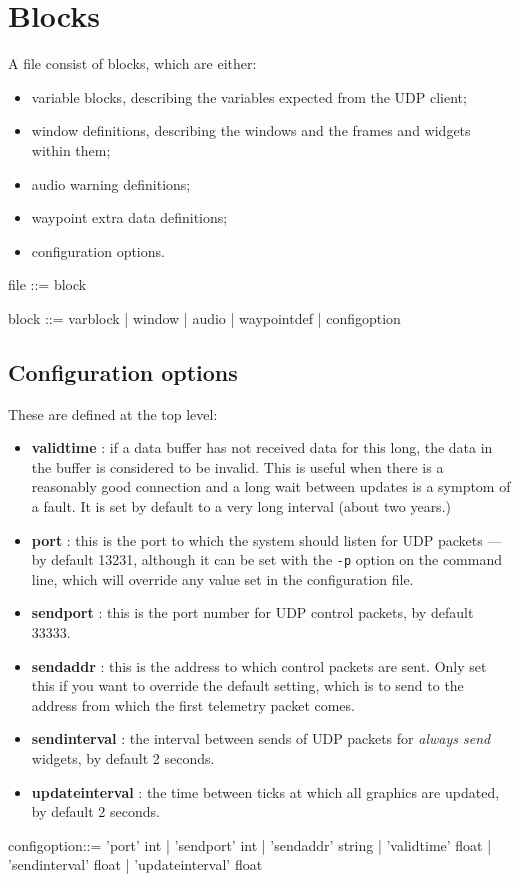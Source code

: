 \section{Blocks}
A file consist of blocks, which are either:
\begin{itemize}
\item variable blocks, describing the variables expected from the UDP client;
\item window definitions, describing the windows and the frames and widgets within them;
\item audio warning definitions;
\item waypoint extra data definitions;
\item configuration options.
\end{itemize}

\begin{v}
file        ::= { block }

block       ::= varblock
            |   window
            |   audio
            |   waypointdef
            |   configoption
\end{v}

\subsection{Configuration options}
These are defined at the top level:
\begin{itemize}
\item \textbf{validtime} : if a data buffer has not received data for this long, the data in the buffer is 
considered to be invalid. This is useful when there is a reasonably good connection and a long wait between updates
is a symptom of a fault. It is set by default to a very long interval (about two years.)
\item \textbf{port} : this is the port to which the system should listen for UDP packets --- by default 13231, although
it can be set with the \verb+-p+ option on the command line, which will override any value set in the configuration file.
\item \textbf{sendport} : this is the port number for UDP control packets, by default 33333. 
\item \textbf{sendaddr} : this is the address to which control packets are sent. Only set this if you want to override the default
setting, which is to send to the address from which the first telemetry packet comes.
\item \textbf{sendinterval} : the interval between sends of UDP packets for \emph{always send} widgets, by default 2 seconds.
\item \textbf{updateinterval} : the time between ticks at which all graphics are updated, by default 2 seconds.
\end{itemize}
\begin{v}
configoption::= 'port' int
            |   'sendport' int
            |   'sendaddr' string
            |   'validtime' float
            |   'sendinterval' float
            |   'updateinterval' float
\end{v}

